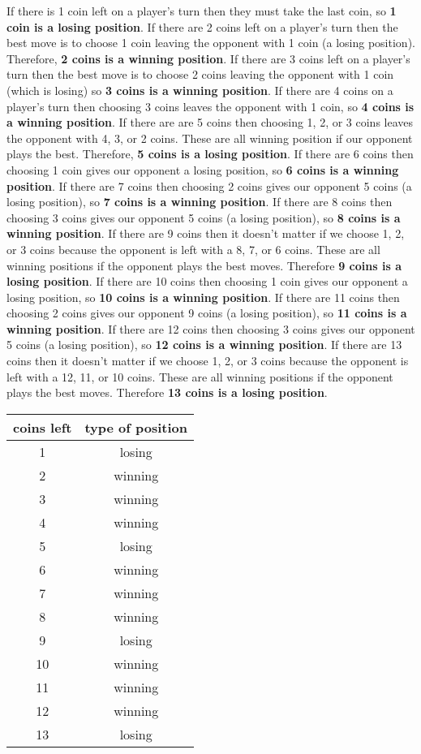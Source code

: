 \documentclass[12pt]{article}
\begin{document}
If there is 1 coin left on a player's turn then they must take the 
last coin, so \textbf{1 coin is a losing position}. If there are 2 
coins left on a player's turn then the best move is to choose 1 coin 
leaving the opponent with 1 coin (a losing position). Therefore, 
\textbf{2 coins is a winning position}. If there are 3 coins left on a 
player's turn then the best move is to choose 2 coins leaving the 
opponent with 1 coin (which is losing) so 
\textbf{3 coins is a winning position}. If there are 4 coins on a 
player's turn then choosing 3 coins leaves
the opponent with 1 coin, so \textbf{4 coins is a winning position}. If
there are are 5 coins then choosing 1, 2, or 3 coins leaves the 
opponent with 4, 3, or 2 coins. These are all winning position if our
opponent plays the best. Therefore, \textbf{5 coins is a losing 
position}. If there are 6 coins then choosing 1 coin gives our
opponent a losing position, so 
\textbf{6 coins is a winning position}. If there are 7 coins then 
choosing 2 coins gives our opponent 5 coins (a losing position), so 
\textbf{7 coins is a winning position}. If there are 8 coins then 
choosing 3 coins gives our opponent 5 coins (a losing position), so 
\textbf{8 coins is a winning position}. If there are 9 coins then it
doesn't matter if we choose 1, 2, or 3 coins because the opponent
is left with a 8, 7, or 6 coins. These are all winning positions if the
opponent plays the best moves. Therefore 
\textbf{9 coins is a losing position}. If there are 10 coins then 
choosing 1 coin gives our opponent a losing position, so 
\textbf{10 coins is a winning position}. If there are 11 coins then 
choosing 2 coins gives our opponent 9 coins (a losing position), so 
\textbf{11 coins is a winning position}. If there are 12 coins then 
choosing 3 coins gives our opponent 5 coins (a losing position), so 
\textbf{12 coins is a winning position}. If there are 13 coins then it
doesn't matter if we choose 1, 2, or 3 coins because the opponent
is left with a 12, 11, or 10 coins. These are all winning positions if 
the opponent plays the best moves. Therefore 
\textbf{13 coins is a losing position}. 
 
 \begin{center}
\begin{tabular}{cc}
coins left & type of position\\
\hline
1 & losing\\
2 & winning\\
3 & winning\\
4 & winning\\
5 & losing\\
6 & winning\\
7 & winning\\
8 & winning\\
9 & losing\\
10 & winning\\
11 & winning\\
12 & winning\\
13 & losing
\end{tabular}
\end{center}
\end{document}

